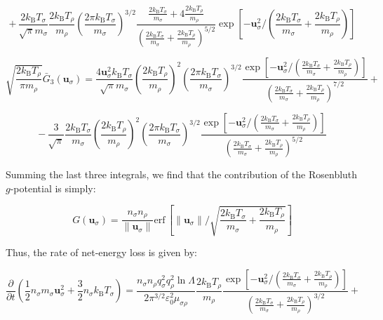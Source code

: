 \begin{equation}
    +\,\frac{2k_\mathrm{B}T_\sigma}{\sqrt{\pi}m_\sigma}\frac{2k_\mathrm{B}T_\rho}{m_\rho}\left(\frac{2\pi k_\mathrm{B}T_\sigma}{m_\sigma}\right)^{3/2}\frac{\frac{2k_\mathrm{B}T_\sigma}{m_\sigma}+4\frac{2k_\mathrm{B}T_\rho}{m_\rho}}{\left(\frac{2k_\mathrm{B}T_\sigma}{m_\sigma}+\frac{2k_\mathrm{B}T_\rho}{m_\rho}\right)^{5/2}}\exp{\left[-\mathbf{u}_\sigma^2\bigg/\left(\frac{2k_\mathrm{B}T_\sigma}{m_\sigma}+\frac{2k_\mathrm{B}T_\rho}{m_\rho}\right)\right]}
\end{equation}

\begin{equation*}
    \sqrt{\frac{2k_\mathrm{B}T_\rho}{\pi m_\rho}}\bar{G}_3(\mathbf{u}_\sigma)=\frac{4\mathbf{u}_\sigma^2k_\mathrm{B}T_\sigma}{\sqrt{\pi}m_\sigma}\left(\frac{2k_\mathrm{B}T_\rho}{m_\rho}\right)^2\left(\frac{2\pi k_\mathrm{B}T_\sigma}{m_\sigma}\right)^{3/2}\frac{\exp{\left[-\mathbf{u}_\sigma^2\bigg/\left(\frac{2k_\mathrm{B}T_\sigma}{m_\sigma}+\frac{2k_\mathrm{B}T_\rho}{m_\rho}\right)\right]}}{\left(\frac{2k_\mathrm{B}T_\sigma}{m_\sigma}+\frac{2k_\mathrm{B}T_\rho}{m_\rho}\right)^{7/2}}+
\end{equation*}

\begin{equation}
    -\,\frac{3}{\sqrt{\pi}}\frac{2k_\mathrm{B}T_\sigma}{m_\sigma}\left(\frac{2k_\mathrm{B}T_\rho}{m_\rho}\right)^2\left(\frac{2\pi k_\mathrm{B}T_\sigma}{m_\sigma}\right)^{3/2}\frac{\exp{\left[-\mathbf{u}_\sigma^2\bigg/\left(\frac{2k_\mathrm{B}T_\sigma}{m_\sigma}+\frac{2k_\mathrm{B}T_\rho}{m_\rho}\right)\right]}}{\left(\frac{2k_\mathrm{B}T_\sigma}{m_\sigma}+\frac{2k_\mathrm{B}T_\rho}{m_\rho}\right)^{5/2}}
\end{equation}

Summing the last three integrals, we find that the contribution of the Rosenbluth $g$-potential is simply:

\begin{equation}
    G(\mathbf{u}_\sigma)=\frac{n_\sigma n_\rho}{\|\mathbf{u}_\sigma\|}\text{erf}\,\left[\|\mathbf{u}_\sigma\|\bigg/\sqrt{\frac{2k_\mathrm{B}T_\sigma}{m_\sigma}+\frac{2k_\mathrm{B}T_\rho}{m_\rho}}\right]
\end{equation}

Thus, the rate of net-energy loss is given by:

\begin{equation*}
    \frac{\partial}{\partial t}\left(\frac{1}{2}n_\sigma m_\sigma\mathbf{u}_\sigma^2+\frac{3}{2}n_\sigma k_\mathrm{B}T_\sigma\right)=\frac{n_\sigma n_\rho q_\sigma^2q_\rho^2\ln{\Lambda}}{2\pi^{3/2}\varepsilon_0^2\mu_{\sigma\rho}}\frac{2k_\mathrm{B}T_\rho}{m_\rho}\frac{\exp{\left[-\mathbf{u}_\sigma^2\bigg/\left(\frac{2k_\mathrm{B}T_\sigma}{m_\sigma}+\frac{2k_\mathrm{B}T_\rho}{m_\rho}\right)\right]}}{\left(\frac{2k_\mathrm{B}T_\sigma}{m_\sigma}+\frac{2k_\mathrm{B}T_\rho}{m_\rho}\right)^{3/2}}+
\end{equation*}

